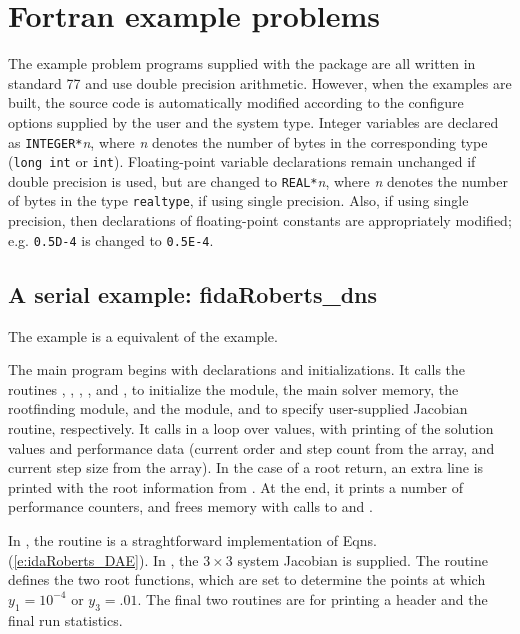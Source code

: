 \section{Fortran example problems}\label{s:ex_fortran}

The {\F} example problem programs supplied with the {\ida}
package are all written in standard {\F}77 and use double precision
arithmetic. However, when the {\F} examples are built, the source code is
automatically modified according to the configure options supplied by the
user and the system type. Integer variables are declared as {\tt INTEGER*}{\em n},
where {\em n} denotes the number of bytes in the corresponding {\C} type
({\tt long int} or {\tt int}). Floating-point variable declarations remain
unchanged if double precision is used, but are changed to {\tt REAL*}{\em n},
where {\em n} denotes the number of bytes in the {\sundials} type {\tt realtype},
if using single precision. Also, if using single precision, then declarations of
floating-point constants are appropriately modified; e.g. {\tt 0.5D-4} is
changed to {\tt 0.5E-4}.


\subsection{A serial example: fidaRoberts\_dns}\label{ss:fidaRoberts}

The  example is a {\F} equivalent of the
 example.

The main program begins with declarations and initializations.  
It calls the routines , , , 
, and , to initialize the {\nvecs} module, 
the main solver memory, the rootfinding module, and the {\idadense} module, 
and to specify user-supplied Jacobian routine, respectively.
It calls  in a loop over  values, with printing of
the solution values and performance data (current order and step count
from the  array, and current step size from the  array).
In the case of a root return, an extra line is printed with the root
information from .  At the end, it prints a number of
performance counters, and frees memory with calls to 
and .

In , the  routine is a straghtforward
implementation of Eqns. (\ref{e:idaRoberts_DAE}).  In , the 
$3 \times 3$ system Jacobian is supplied.  The  routine
defines the two root functions, which are set to determine the points at which
$y_1 = 10^{-4}$ or $y_3 = .01$.  The final two routines are for
printing a header and the final run statistics.

